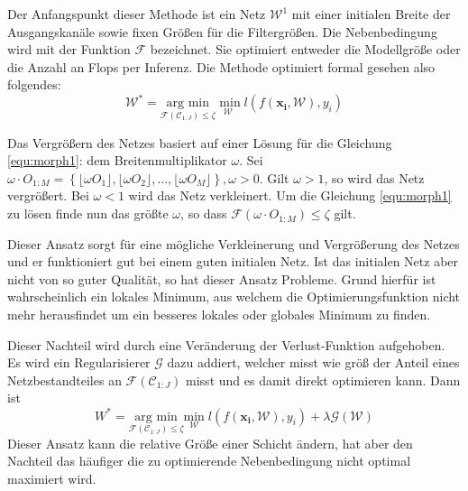 Der Anfangspunkt dieser Methode ist ein Netz $\mathcal{W}^1$ mit einer initialen Breite der Ausgangskanäle sowie fixen Größen für die Filtergrößen. Die Nebenbedingung wird mit der Funktion $\mathcal{F}$ bezeichnet. Sie optimiert entweder die Modellgröße oder die Anzahl an Flops per Inferenz. Die Methode optimiert formal gesehen also folgendes:
\begin{equation}
 \mathcal{W}^{\ast}= \underset{\mathcal{F}(\mathcal{C}_{1:J})\leq \zeta}{\text{arg min}} \underset{\mathcal{W}}{\text{ min}}\; l(f(\mathbf{x_i}, \mathcal{W}),y_i)\label{equ:morph1}
\end{equation}

Das Vergrößern des Netzes basiert auf einer Lösung für die Gleichung \ref{equ:morph1}: dem Breitenmultiplikator $\omega$. 
Sei $\omega \cdot O_{1:M} = \left\{ \lfloor \omega O_1 \rfloor, \lfloor \omega O_2 \rfloor, \ldots , \lfloor \omega O_M \rfloor \right\}, \omega>0$. Gilt $\omega>1$, so wird das Netz vergrößert. Bei $\omega <1$ wird das Netz verkleinert. Um die Gleichung \ref{equ:morph1} zu lösen finde nun das größte $\omega$, so dass $\mathcal{F}(\omega \cdot O_{1:M})\leq \zeta$ gilt.


Dieser Ansatz sorgt für eine mögliche Verkleinerung und Vergrößerung des Netzes und er funktioniert gut bei einem guten initialen Netz. Ist das initialen Netz aber nicht von so guter Qualität, so hat dieser Ansatz Probleme. Grund hierfür ist wahrscheinlich ein lokales Minimum, aus welchem die Optimierungsfunktion nicht mehr herausfindet um ein besseres lokales oder globales Minimum zu finden.

Dieser Nachteil wird durch eine Veränderung der Verlust-Funktion aufgehoben. Es wird ein Regularisierer $\mathcal{G}$ dazu addiert, welcher misst wie größ der Anteil eines Netzbestandteiles an $\mathcal{F}( \mathcal{C}_{1:J})$ misst und es damit direkt optimieren kann. Dann ist
\begin{equation}
 W^{\ast}= \underset{\mathcal{F}(\mathcal{C}_{1:J})\leq \zeta}{\text{arg min}} \underset{\mathcal{W}}{\text{min}}\; l(f(\mathbf{x_i}, \mathcal{W}),y_i) + \lambda \mathcal{G}( \mathcal{W})  
 \label{equ:morph2}
\end{equation}
Dieser Ansatz kann die relative Größe einer Schicht ändern, hat aber den Nachteil das häufiger die zu optimierende Nebenbedingung nicht optimal maximiert wird.




